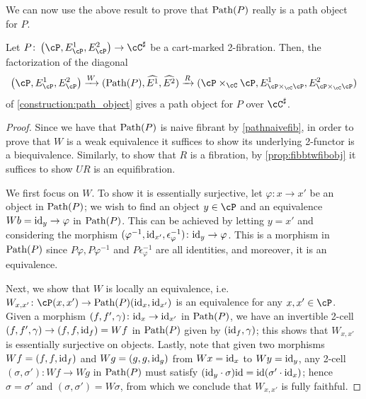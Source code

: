 \documentclass[11pt, dvipsnames]{amsart}
\begin{document}
    We can now use the above result to prove that $\mathrm{Path}(P)$ really is a path object for $P$.

	\begin{prop}
	\label{prop:path-object}
		Let $P\colon \markedscat{\cP} \to \cC^{\sharp}$ be a cart-marked 2-fibration. Then, the factorization of the diagonal
        	\[
	\markedscat{\cP}\xrightarrow{W} (\Path(P),\widehat{E^1},\widehat{E^2})\xrightarrow{R} (\cP\times_{\cC}\cP,E^1_{\cP\times_{\cC}\cP}, E^2_{\cP\times_{\cC}\cP})
	\] of \cref{construction:path_object} gives a path object for $P$  over $\cC^{\sharp}$.
	\end{prop}
	\begin{proof}
	Since we have that $\mathrm{Path}(P)$ is naive fibrant by \cref{pathnaivefib}, in order to prove that $W$ is a weak equivalence it suffices to show its underlying 2-functor is a biequivalence. Similarly, to show that $R$ is a fibration, by \cref{prop:fibbtwfibobj} it suffices to show $UR$ is an equifibration.

    We first focus on $W$. To show it is essentially surjective, let $\varphi\colon x\to x'$ be an object in $\mathrm{Path}(P)$; we wish to find an object $y\in\cP$ and an equivalence $Wb=\mathrm{id}_y\to \varphi$ in $\mathrm{Path}(P)$. This can be achieved by letting $y=x'$ and considering the morphism $(\varphi^{-1},\mathrm{id}_{x'},\epsilon_\varphi^{-1})\colon\mathrm{id}_y\to \varphi$. This is a morphism in $\mathrm{Path}(P)$ since $P\varphi,P\varphi^{-1}$ and $P\epsilon_\varphi^{-1}$ are all identities, and moreover, it is an equivalence.

    Next, we show that $W$ is locally an equivalence, i.e.\ $W_{x,x'}\colon\cP(x,x')\to\Path(P)(\id_x,\id_{x'})$ is an equivalence for any $x,x'\in\cP$. Given a morphism $(f,f',\gamma)\colon\mathrm{id}_{x}\to\mathrm{id}_{x'}$ in $\mathrm{Path}(P)$, we have an invertible 2-cell $(f,f',\gamma)\to (f,f,\mathrm{id}_f)=Wf$ in $\mathrm{Path}(P)$ given by $(\mathrm{id}_f,\gamma)$; this shows that $W_{x,x'}$ is essentially surjective on objects. Lastly, note that given two morphisms $Wf=(f,f,\mathrm{id}_f)$ and $Wg=(g,g,\mathrm{id}_g)$ from $Wx=\mathrm{id}_x$ to $Wy=\mathrm{id}_y$, any 2-cell $(\sigma,\sigma')\colon Wf\to Wg$ in $\mathrm{Path}(P)$ must satisfy $(\mathrm{id}_y\cdot \sigma)\mathrm{id} = \mathrm{id}(\sigma'\cdot \mathrm{id}_x)$; hence $\sigma=\sigma'$ and $(\sigma,\sigma')=W\sigma$, from which we conclude that $W_{x,x'}$ is fully faithful.


\end{proof}
\end{document}
